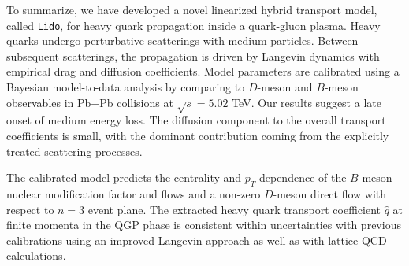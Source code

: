 To summarize, we have developed a novel linearized hybrid transport model, called {\tt Lido}, for heavy quark propagation inside a quark-gluon plasma.
Heavy quarks undergo perturbative scatterings with medium particles. Between subsequent scatterings, the propagation is driven by Langevin dynamics with empirical drag and diffusion coefficients.
Model parameters are calibrated using a Bayesian model-to-data analysis by comparing to $D$-meson and $B$-meson observables in Pb+Pb collisions at $\sqrt{s}=5.02$ TeV.
Our results suggest a late onset of medium energy loss.
The diffusion component to the overall transport coefficients is small, with the dominant contribution coming from the explicitly treated scattering processes.

The calibrated model predicts the centrality and $p_T$ dependence of the $B$-meson nuclear modification factor and flows and a non-zero $D$-meson direct flow with respect to $n=3$ event plane.
The extracted heavy quark transport coefficient $\hat{q}$ at finite momenta in the QGP phase is consistent within uncertainties with previous calibrations using an improved Langevin approach as well as with lattice QCD calculations.




